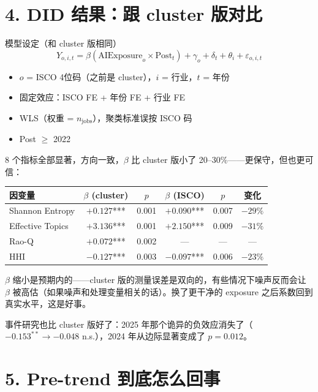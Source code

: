 \documentclass[12pt,a4paper]{article}
\begin{document}
\section*{4. DID 结果：跟 cluster 版对比}

\begin{defbox}{模型设定（和 cluster 版相同）}
$$Y_{o,i,t} = \beta (\text{AIExposure}_o \times \text{Post}_t) + \gamma_o + \delta_t + \theta_i + \varepsilon_{o,i,t}$$

\begin{itemize}
  \item $o$ = ISCO 4位码（之前是 cluster），$i$ = 行业，$t$ = 年份
  \item 固定效应：ISCO FE + 年份 FE + 行业 FE
  \item WLS（权重 = $n_{\text{jobs}}$），聚类标准误按 ISCO 码
  \item Post $\geq$ 2022
\end{itemize}
\end{defbox}

\medskip

8 个指标全部显著，方向一致，$\beta$ 比 cluster 版小了 20--30\%——更保守，但也更可信：

\begin{center}
\small
\begin{tabular}{lccccc}
\toprule
因变量 & $\beta$ (cluster) & $p$ & $\beta$ (ISCO) & $p$ & 变化 \\
\midrule
Shannon Entropy & $+0.127$*** & 0.001 & $+0.090$*** & 0.007 & $-29\%$ \\
Effective Topics & $+3.136$*** & 0.001 & $+2.150$*** & 0.009 & $-31\%$ \\
Rao-Q & $+0.072$*** & 0.002 & --- & --- & --- \\
HHI & $-0.127$*** & 0.003 & $-0.097$*** & 0.006 & $-23\%$ \\
\bottomrule
\end{tabular}
\end{center}

$\beta$ 缩小是预期内的——cluster 版的测量误差是双向的，有些情况下噪声反而会让 $\beta$ 被高估（如果噪声和处理变量相关的话）。换了更干净的 exposure 之后系数回到真实水平，这是好事。

事件研究也比 cluster 版好了：2025 年那个诡异的负效应消失了（$-0.153^{**} \rightarrow -0.048$ n.s.），2024 年从边际显著变成了 $p=0.012$。

\bigskip

\section*{5. Pre-trend 到底怎么回事}
\end{document}
